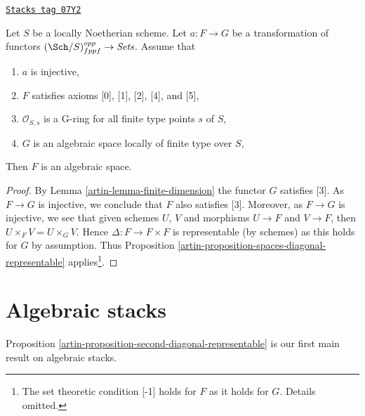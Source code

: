 \begin{lemma}[Monomorphism]
\label{artin-lemma-monomorphism}
\href{https://stacks.math.columbia.edu/tag/07Y2}{\texttt{Stacks tag 07Y2}}

Let $S$ be a locally Noetherian scheme. Let $a : F \to G$ be a transformation
of functors $(\Sch/S)_{fppf}^{opp} \to \textit{Sets}$.
Assume that
\begin{enumerate}
\item $a$ is injective,
\item $F$ satisfies axioms [0], [1], [2], [4], and [5],
\item $\mathcal{O}_{S, s}$ is a G-ring for all finite type points $s$ of $S$,
\item $G$ is an algebraic space locally of finite type over $S$,
\end{enumerate}
Then $F$ is an algebraic space.
\end{lemma}

\begin{proof}

By Lemma \ref{artin-lemma-finite-dimension} the functor $G$ satisfies [3].
As $F \to G$ is injective, we conclude that $F$ also satisfies [3].
Moreover, as $F \to G$ is injective, we see that given schemes
$U$, $V$ and morphisms $U \to F$ and $V \to F$, then
$U \times_F V = U \times_G V$. Hence $\Delta : F \to F \times F$ is
representable (by schemes) as this holds for $G$ by assumption.
Thus Proposition \ref{artin-proposition-spaces-diagonal-representable}
applies\footnote{The set
theoretic condition [-1] holds for $F$ as it holds for $G$. Details
omitted.}.
\end{proof}

\section{Algebraic stacks}
\label{artin-section-algebraic-stacks}
Proposition \ref{artin-proposition-second-diagonal-representable} is our first
main result on algebraic stacks.

